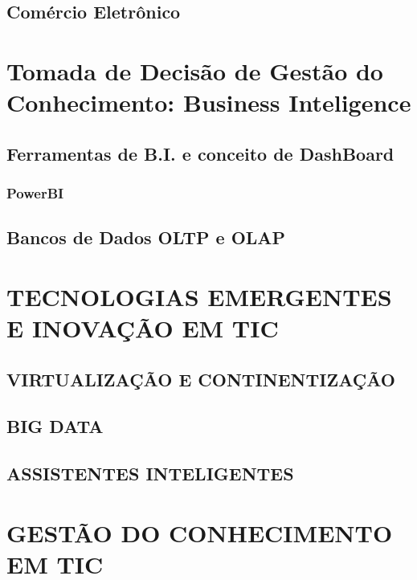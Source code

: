 \documentclass[
]{book}
\begin{document}
\section{Comércio Eletrônico}\label{comuxe9rcio-eletruxf4nico}

\chapter{Tomada de Decisão de Gestão do Conhecimento: Business Inteligence}\label{tomada-de-decisuxe3o-de-gestuxe3o-do-conhecimento-business-inteligence}

\section{Ferramentas de B.I. e conceito de DashBoard}\label{ferramentas-de-b.i.-e-conceito-de-dashboard}

\subsection{PowerBI}\label{powerbi}

\section{Bancos de Dados OLTP e OLAP}\label{bancos-de-dados-oltp-e-olap}

\chapter{TECNOLOGIAS EMERGENTES E INOVAÇÃO EM TIC}\label{tecnologias-emergentes-e-inovauxe7uxe3o-em-tic}

\section{VIRTUALIZAÇÃO E CONTINENTIZAÇÃO}\label{virtualizauxe7uxe3o-e-continentizauxe7uxe3o}

\section{BIG DATA}\label{big-data}

\section{ASSISTENTES INTELIGENTES}\label{assistentes-inteligentes}

\chapter{GESTÃO DO CONHECIMENTO EM TIC}\label{gestuxe3o-do-conhecimento-em-tic}
\end{document}
